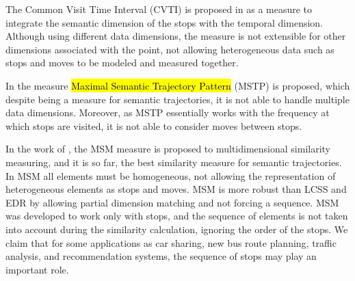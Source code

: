 \documentclass[12pt]{article}
\begin{document}

The Common Visit Time Interval (CVTI) is proposed in \cite{Kang:2009:SMT:1529282.1529580} as a measure to integrate the semantic dimension of the stops with the temporal dimension. Although using different data dimensions, the measure is not extensible for other dimensions associated with the point, not allowing heterogeneous data such as stops and moves to be modeled and measured together.

In \cite{Ying:2010:MUS:1867699.1867703} the measure \hl{Maximal Semantic Trajectory Pattern} (MSTP) is proposed, which despite being a measure for semantic trajectories, it is not able to handle multiple data dimensions. Moreover, as MSTP essentially works with the frequency at which stops are visited, it is not able to consider moves between stops.

In the work of \cite{Furtado:TGIS12156}, the MSM measure is proposed to multidimensional similarity measuring, and it is so far, the best similarity measure for semantic trajectories. In MSM all elements must be homogeneous, not allowing the representation of heterogeneous elements as stops and moves. MSM is more robust than LCSS and EDR by allowing partial dimension matching and not forcing a sequence. MSM was developed to work only with stops, and the sequence of elements is not taken into account during the similarity calculation, ignoring the order of the stops. We claim that for some applications as car sharing, new bus route planning, traffic analysis, and recommendation systems, the sequence of stops may play an important role.
\end{document}
